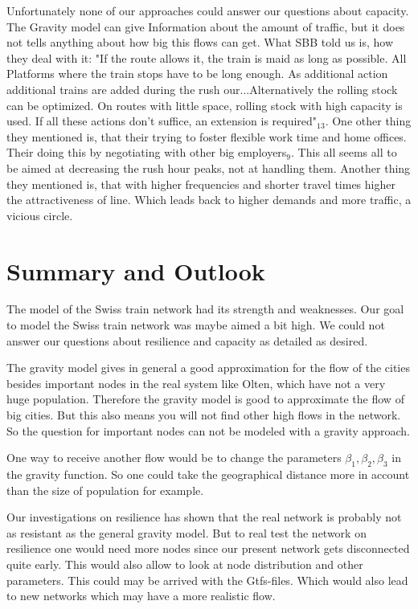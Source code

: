 \documentclass[11pt]{article}
\begin{document}
Unfortunately none of our approaches could answer our questions about capacity. The Gravity model can give Information about the amount of traffic, but it does not tells anything about how big this flows can get. What SBB told us is, how they deal with it: "If the route allows it, the train is maid as long as possible. All Platforms where the train stops have to be long enough. As additional action additional trains are added during the rush our...Alternatively the rolling stock can be optimized. On routes with little space, rolling stock with high capacity is used. If all these actions don't suffice, an extension is required"$_{13}$. One other thing they mentioned is, that their trying to foster flexible work time and home offices. Their doing this by negotiating with other big employers$_{9}$. This all seems all to be aimed at decreasing the rush hour peaks, not at handling them. Another thing they mentioned is, that with higher frequencies and shorter travel times higher the attractiveness of line. Which leads back to higher demands and more traffic, a vicious circle.




\section{Summary and Outlook}

The model of the Swiss train network had its strength and weaknesses. Our goal to model the Swiss train network was maybe aimed a bit high. We could not answer our questions about resilience and capacity as detailed as desired. 

The gravity model gives in general a good approximation for the flow of the cities besides important nodes in the real system like Olten, which have not a very huge population. Therefore the gravity model is good to approximate the flow of big cities. But this also means you will not find other high flows in the network. So the question for important nodes can not be modeled with a gravity approach.

One way to receive another flow would be to change the parameters $\beta_1,\beta_2,\beta_3$ in the gravity function. So one could take the geographical distance more in account than the size of population for example. \newline

Our investigations on resilience has shown that the real network is probably not as resistant as the general gravity model. But to real test the network on resilience one would need more nodes since our present network gets disconnected quite early. This would also allow to look at node distribution and other parameters. This could may be arrived with the Gtfs-files. Which would also lead to new networks which may have a more realistic flow.
\end{document}
